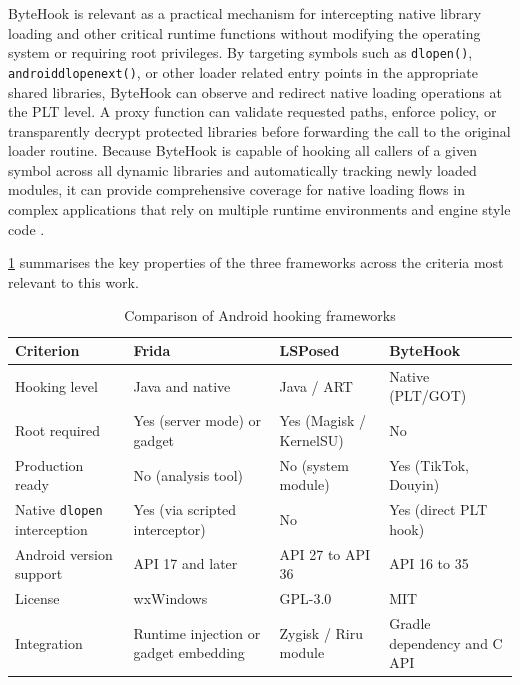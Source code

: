\documentclass[11pt,a4paper]{report}
\renewcommand\_{{\textunderscore\allowbreak}}
\begin{document}
ByteHook is relevant as a practical mechanism for intercepting native library loading and other critical runtime functions without modifying the operating system or requiring root privileges. By targeting symbols such as \texttt{dlopen()}, \texttt{android\_dlopen\_ext()}, or other loader related entry points in the appropriate shared libraries, ByteHook can observe and redirect native loading operations at the PLT level. A proxy function can validate requested paths, enforce policy, or transparently decrypt protected libraries before forwarding the call to the original loader routine. Because ByteHook is capable of hooking all callers of a given symbol across all dynamic libraries and automatically tracking newly loaded modules, it can provide comprehensive coverage for native loading flows in complex applications that rely on multiple runtime environments and engine style code \cite{bytehook2025github,pizzi2022virtualpatch}.

\cref{tab:framework_comparison} summarises the key properties of the three frameworks across the criteria most relevant to this work.

\begin{table}[H]
    \centering
    \caption{Comparison of Android hooking frameworks}
    \label{tab:framework_comparison}
    \begin{tabular}{|p{}|p{}|p{}|p{}|}
        \hline
        \textbf{Criterion} & \textbf{Frida} & \textbf{LSPosed} & \textbf{ByteHook} \\
        \hline
        Hooking level & Java and native & Java / ART & Native (PLT/GOT) \\
        \hline
        Root required & Yes (server mode) or gadget & Yes (Magisk / KernelSU) & No \\
        \hline
        Production ready & No (analysis tool) & No (system module) & Yes (TikTok, Douyin) \\
        \hline
        Native \texttt{dlopen} interception & Yes (via scripted interceptor) & No & Yes (direct PLT hook) \\
        \hline
        Android version support & API 17 and later & API 27 to API 36 & API 16 to 35 \\
        \hline
        License & wxWindows & GPL-3.0 & MIT \\
        \hline
        Integration & Runtime injection or gadget embedding & Zygisk / Riru module & Gradle dependency and C API \\
        \hline
    \end{tabular}
\end{table}
\end{document}
